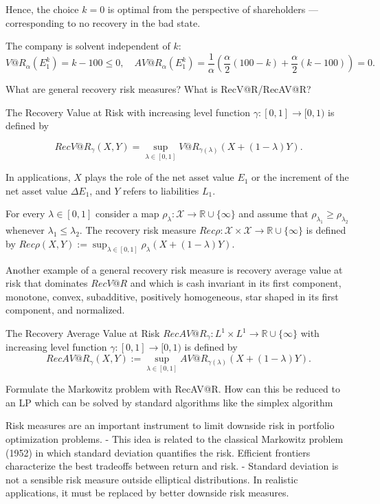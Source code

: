 Hence, the choice \(k=0\) is optimal from the perspective of shareholders — corresponding to no recovery in the bad state.

The company is solvent independent of \(k\):
\[V@R_{\alpha}(E_1^k) = k-100 \leq 0, \quad AV@R_{\alpha}(E_1^k) = \frac{1}{\alpha} \left( \frac{\alpha}{2}(100-k) + \frac{\alpha}{2}(k-100) \right) = 0.\]

What are general recovery risk measures? What is RecV@R/RecAV@R?

The Recovery Value at Risk with increasing level function \(\gamma: [0,1] \rightarrow [0,1)\) is defined by

\[RecV@R_{\gamma}(X, Y) = \sup_{\lambda \in [0,1]} V@R_{\gamma(\lambda)}(X + (1-\lambda)Y).\]

In applications, \(X\) plays the role of the net asset value \(E_1\) or the increment of the net asset value \(\Delta E_1\), and \(Y\) 
refers to liabilities \(L_1\).

For every \(\lambda \in [0,1]\) consider a map \(\rho_{\lambda}: \mathcal{X} \rightarrow \mathbb{R} \cup \{\infty\}\) and assume that 
\(\rho_{\lambda_1} \geq \rho_{\lambda_2}\) whenever \(\lambda_1 \leq \lambda_2\). 
The recovery risk measure \(Rec\rho: \mathcal{X} \times \mathcal{X} \rightarrow \mathbb{R} \cup \{\infty\}\) is defined by 
\(Rec\rho(X, Y) := \sup_{\lambda \in [0,1]} \rho_{\lambda}(X + (1-\lambda)Y)\).

Another example of a general recovery risk measure is recovery average value at risk that dominates \(RecV@R\) and which is 
cash invariant in its first component, monotone, convex, subadditive, positively homogeneous, star shaped in its first component, 
and normalized.

The Recovery Average Value at Risk \(RecAV@R_{\gamma}: L^1 \times L^1 \rightarrow \mathbb{R} \cup \{\infty\}\) with increasing level function \(\gamma: [0,1] \rightarrow [0,1)\) is defined by
\[RecAV@R_{\gamma}(X, Y) := \sup_{\lambda \in [0,1]} AV@R_{\gamma(\lambda)}(X + (1-\lambda)Y).\]


Formulate the Markowitz problem with RecAV@R. How can this be reduced to
an LP which can be solved by standard algorithms like the simplex algorithm

Risk measures are an important instrument to limit downside risk in portfolio optimization problems.
- This idea is related to the classical Markowitz problem (1952) in which standard deviation quantifies the risk. Efficient frontiers characterize 
  the best tradeoffs between return and risk.
- Standard deviation is not a sensible risk measure outside elliptical distributions. In realistic applications, 
  it must be replaced by better downside risk measures.

